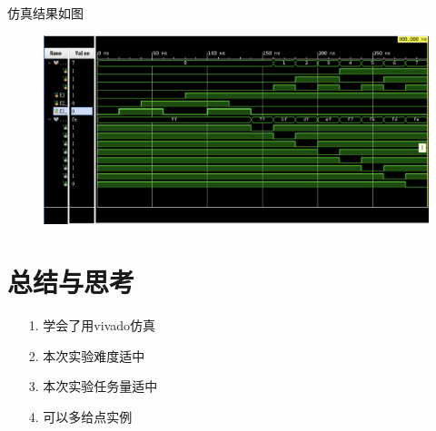 \documentclass{article}
\begin{document}
    仿真结果如图
    \begin{figure}[htbp]
        \centering
        \includegraphics[scale=0.5]{t4r.png}
    \end{figure}
	
	\clearpage
    \section{总结与思考}
	\begin{enumerate}
		\item [1.]学会了用vivado仿真
		\item [2.]本次实验难度适中
		\item [3.]本次实验任务量适中
		\item [4.]可以多给点实例
	\end{enumerate}
\end{document}
